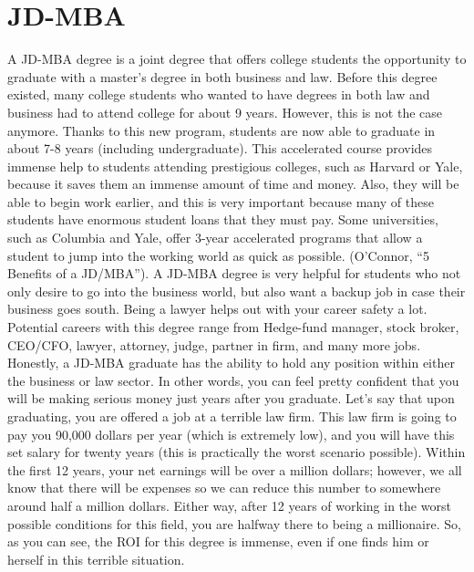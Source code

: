 \chapter{JD-MBA}

A JD-MBA degree is a joint degree that offers college students the opportunity to graduate with a master’s degree in both business and law. Before this degree existed, many college students who wanted to have degrees in both law and business had to attend college for about 9 years. However, this is not the case anymore. Thanks to this new program, students are now able to graduate in about 7-8 years (including undergraduate). This accelerated course provides immense help to students attending prestigious colleges, such as Harvard or Yale, because it saves them an immense amount of time and money. Also, they will be able to begin work earlier, and this is very important because many of these students have enormous student loans that they must pay.  Some universities, such as Columbia and Yale, offer 3-year accelerated programs that allow a student to jump into the working world as quick as possible. (O’Connor, “5 Benefits of a JD/MBA”). A JD-MBA degree is very helpful for students who not only desire to go into the business world, but also want a backup job in case their business goes south. Being a lawyer helps out with your career safety a lot. Potential careers with this degree range from Hedge-fund manager, stock broker, CEO/CFO, lawyer, attorney, judge, partner in firm, and many more jobs. Honestly, a JD-MBA graduate has the ability to hold any position within either the business or law sector. In other words, you can feel pretty confident that you will be making serious money just years after you graduate. Let's say that upon graduating, you are offered a job at a terrible law firm. This law firm is going to pay you 90,000 dollars per year (which is extremely low), and you will have this set salary for twenty years (this is practically the worst scenario possible). Within the first 12 years, your net earnings will be over a million dollars; however, we all know that there will be expenses so we can reduce this number to somewhere around half a million dollars. Either way, after 12 years of working in the worst possible conditions for this field, you are halfway there to being a millionaire. So, as you can see, the ROI for this degree is immense, even if one finds him or herself in this terrible situation.  

